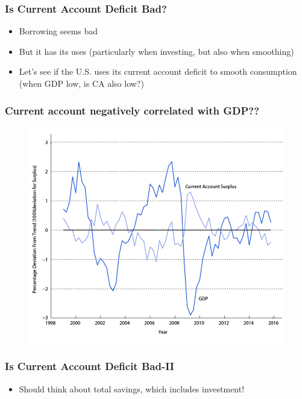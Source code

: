 \documentclass{beamer}
\begin{document}
\begin{frame}
\frametitle[alignment=center]{Is Current Account Deficit Bad?}
\begin{itemize}
\item Borrowing seems bad
\bigskip
\item But it has its uses (particularly when investing, but also when smoothing)
\bigskip
\item Let's see if the U.S. uses its current account deficit to smooth consumption (when GDP low, is CA also low?)
\end{itemize}
\end{frame}


\begin{frame}
\frametitle[alignment=center]{Current account negatively correlated with GDP??}
\begin{figure}
\centering
\includegraphics[scale=0.7]{Figures/W_Fig_16pt2.png}
\end{figure}
\end{frame}



\begin{frame}
\frametitle[alignment=center]{Is Current Account Deficit Bad-II}
\begin{itemize}
\item Should think about total savings, which includes investment!
\end{itemize}
\end{frame}
\end{document}
